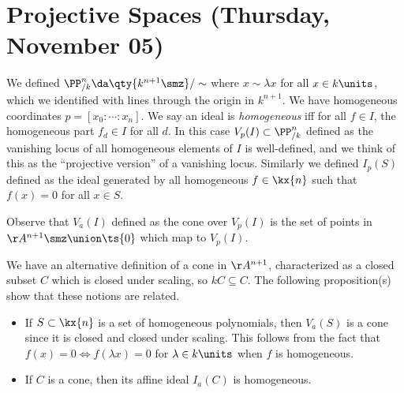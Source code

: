 
\hypertarget{projective-spaces-thursday-november-05}{%
\section{Projective Spaces (Thursday, November
05)}\label{projective-spaces-thursday-november-05}}

We defined \(\PP^n_{/k} \da \qty{ k^{n+1}\smz} /\sim\) where
\(x\sim \lambda x\) for all \(x\in k\units\), which we identified with
lines through the origin in \(k^{n+1}\). We have homogeneous coordinates
\(p = [x_0: \cdots : x_n]\). We say an ideal is \emph{homogeneous} iff
for all \(f\in I\), the homogeneous part \(f_d\in I\) for all \(d\). In
this case \(V_p(I) \subset \PP^{n}_{/k}\) defined as the vanishing locus
of all homogeneous elements of \(I\) is well-defined, and we think of
this as the ``projective version'' of a vanishing locus. Similarly we
defined \(I_p(S)\) defined as the ideal generated by all homogeneous
\(f\in \kx{n}\) such that \(f(x) = 0\) for all \(x\in S\).

\begin{remark}

Observe that \(V_a(I)\) defined as the cone over \(V_p(I)\) is the set
of points in \(\AA^{n+1}\smz \union \ts{0}\) which map to \(V_p(I)\).

\end{remark}

We have an alternative definition of a cone in \(\AA^{n+1}\),
characterized as a closed subset \(C\) which is closed under scaling, so
\(kC\subseteq C\). The following proposition(s) show that these notions
are related.

\begin{proposition}

\envlist

\begin{itemize}
\item
  If \(S\subset \kx{n}\) is a set of homogeneous polynomials, then
  \(V_a(S)\) is a cone since it is closed and closed under scaling. This
  follows from the fact that \(f(x) = 0 \iff f(\lambda x) = 0\) for
  \(\lambda \in k\units\) when \(f\) is homogeneous.
\item
  If \(C\) is a cone, then its affine ideal \(I_a(C)\) is homogeneous.
\end{itemize}

\end{proposition}

